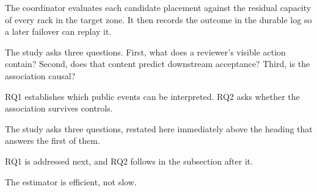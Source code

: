 The coordinator evaluates each candidate placement against the residual capacity of every rack in the target zone. It then records the outcome in the durable log so a later failover can replay it.


The study asks three questions. First, what does a reviewer's visible action contain? Second, does that content predict downstream acceptance? Third, is the association causal?

RQ1 establishes which public events can be interpreted. RQ2 asks whether the association survives controls.

The study asks three questions, restated here immediately above the heading that answers the first of them.

RQ1 is addressed next, and RQ2 follows in the subsection after it.


The estimator is efficient, not slow.

